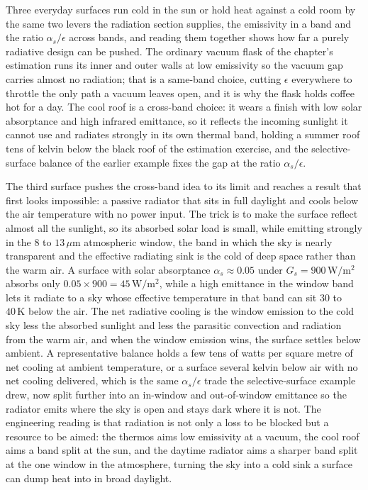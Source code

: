 Three everyday surfaces run cold in the sun or hold heat against a cold room
by the same two levers the radiation section supplies, the emissivity in a
band and the ratio $\alpha_s/\epsilon$ across bands, and reading them together
shows how far a purely radiative design can be pushed. The ordinary vacuum
flask of the chapter's estimation runs its inner and outer walls at low
emissivity so the vacuum gap carries almost no radiation; that is a
same-band choice, cutting $\epsilon$ everywhere to throttle the only path a
vacuum leaves open, and it is why the flask holds coffee hot for a day. The
cool roof is a cross-band choice: it wears a finish with low solar
absorptance and high infrared emittance, so it reflects the incoming sunlight
it cannot use and radiates strongly in its own thermal band, holding a summer
roof tens of kelvin below the black roof of the estimation exercise, and the
selective-surface balance of the earlier example fixes the gap at the ratio
$\alpha_s/\epsilon$.

The third surface pushes the cross-band idea to its limit and reaches a
result that first looks impossible: a passive radiator that sits in full
daylight and cools below the air temperature with no power input. The trick is
to make the surface reflect almost all the sunlight, so its absorbed solar
load is small, while emitting strongly in the $8$ to $13\,\mu\text{m}$
atmospheric window, the band in which the sky is nearly transparent and the
effective radiating sink is the cold of deep space rather than the warm air.
A surface with solar absorptance $\alpha_s \approx 0.05$ under
$G_s = 900\,\text{W}/\text{m}^2$ absorbs only $0.05\times900 = 45\,\text{W}/
\text{m}^2$, while a high emittance in the window band lets it radiate to a
sky whose effective temperature in that band can sit $30$ to $40\,\si{\kelvin}$
below the air. The net radiative cooling is the window emission to the cold
sky less the absorbed sunlight and less the parasitic convection and radiation
from the warm air, and when the window emission wins, the surface settles
below ambient. A representative balance holds a few tens of watts per square
metre of net cooling at ambient temperature, or a surface several kelvin below
air with no net cooling delivered, which is the same $\alpha_s/\epsilon$ trade
the selective-surface example drew, now split further into an in-window and
out-of-window emittance so the radiator emits where the sky is open and stays
dark where it is not. The engineering reading is that radiation is not only a
loss to be blocked but a resource to be aimed: the thermos aims low emissivity
at a vacuum, the cool roof aims a band split at the sun, and the daytime
radiator aims a sharper band split at the one window in the atmosphere,
turning the sky into a cold sink a surface can dump heat into in broad
daylight.


